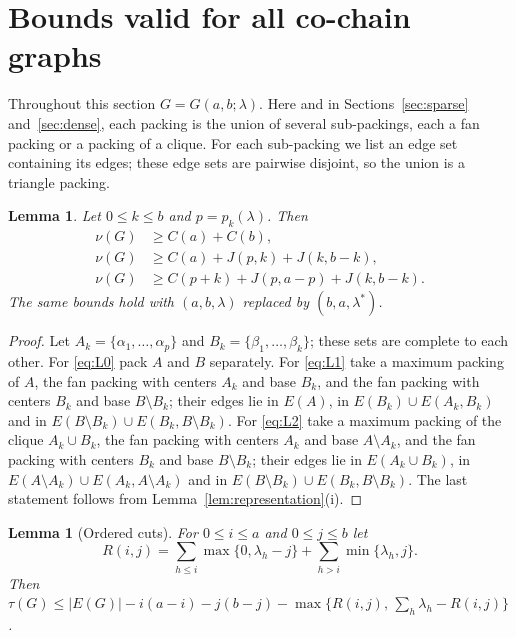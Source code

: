 \documentclass{amsart}
\newtheorem{lemma}[theorem]{Lemma}
\theoremstyle{definition}
\numberwithin{equation}{section}
\numberwithin{table}{section}
\begin{document}
\section{Bounds valid for all co-chain graphs}\label{sec:general}

Throughout this section $G=G(a,b;\lambda)$. Here and in Sections~\ref{sec:sparse} and~\ref{sec:dense}, each packing is the union of several sub-packings, each a fan packing or a packing of a clique. For each sub-packing we list an edge set containing its edges; these edge sets are pairwise disjoint, so the union is a triangle packing.

\begin{lemma}\label{lem:pivot}
Let $0\le k\le b$ and $p=p_k(\lambda)$. Then
\begin{align}
\nu(G)&\ge C(a)+C(b), \label{eq:L0}\\
\nu(G)&\ge C(a)+J(p,k)+J(k,b-k), \label{eq:L1}\\
\nu(G)&\ge C(p+k)+J(p,a-p)+J(k,b-k). \label{eq:L2}
\end{align}
The same bounds hold with $(a,b,\lambda)$ replaced by $(b,a,\lambda^*)$.
\end{lemma}

\begin{proof}
Let $A_k=\{\alpha_1,\dots,\alpha_p\}$ and $B_k=\{\beta_1,\dots,\beta_k\}$; these sets are complete to each other. For \eqref{eq:L0} pack $A$ and $B$ separately. For \eqref{eq:L1} take a maximum packing of $A$, the fan packing with centers $A_k$ and base $B_k$, and the fan packing with centers $B_k$ and base $B\setminus B_k$; their edges lie in $E(A)$, in $E(B_k)\cup E(A_k,B_k)$ and in $E(B\setminus B_k)\cup E(B_k,B\setminus B_k)$. For \eqref{eq:L2} take a maximum packing of the clique $A_k\cup B_k$, the fan packing with centers $A_k$ and base $A\setminus A_k$, and the fan packing with centers $B_k$ and base $B\setminus B_k$; their edges lie in $E(A_k\cup B_k)$, in $E(A\setminus A_k)\cup E(A_k,A\setminus A_k)$ and in $E(B\setminus B_k)\cup E(B_k,B\setminus B_k)$. The last statement follows from Lemma~\ref{lem:representation}(i).
\end{proof}

\begin{lemma}[Ordered cuts]\label{lem:cut}
For $0\le i\le a$ and $0\le j\le b$ let
\[
R(i,j)=\sum_{h\le i}\max\{0,\lambda_h-j\}+\sum_{h>i}\min\{\lambda_h,j\}.
\]
Then $\tau(G)\le |E(G)|-i(a-i)-j(b-j)-\max\{R(i,j),\,\sum_h\lambda_h-R(i,j)\}$.
\end{lemma}
\end{document}
